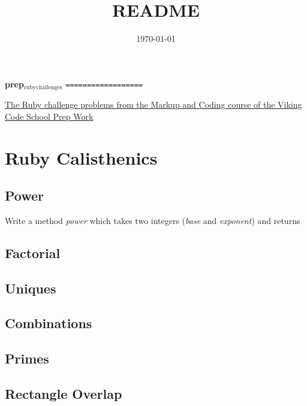\documentclass[11pt]{article}
\date{\today}
\title{README}
\begin{document}
\maketitle
\textbf{prep$_{\text{ruby}}$$_{\text{challenges}}$}
\texttt{==================}

\href{http://www.vikingcodeschool.com/web-markup-and-coding/level-up-your-ruby-judo}{The Ruby challenge problems from the Markup and Coding course of the Viking Code School Prep Work}


\section{Ruby Calisthenics}
\label{sec-1}

\subsection{Power}
\label{sec-1-1}

Write a method \emph{power} which takes two integers (\emph{base} and \emph{exponent}) and 
returns

\subsection{Factorial}
\label{sec-1-2}
\subsection{Uniques}
\label{sec-1-3}
\subsection{Combinations}
\label{sec-1-4}
\subsection{Primes}
\label{sec-1-5}
\subsection{Rectangle Overlap}
\label{sec-1-6}
\end{document}
